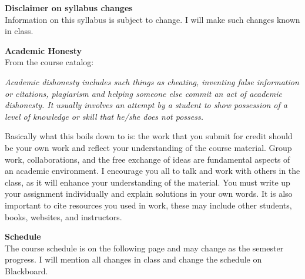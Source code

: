 \documentclass[11pt]{article}
\begin{document}
{\bf Disclaimer on syllabus changes} \\
Information on this syllabus is subject to change. I will make such changes known in class.

{\bf Academic Honesty} \\
From the course catalog:

{\small \it  Academic dishonesty includes such things as cheating, inventing false information or citations, plagiarism and helping someone else commit an act of academic dishonesty. It usually involves an attempt by a student to show possession of a level of knowledge or skill that he/she does not possess.}

Basically what this boils down to is: the work that you submit for credit should be your own work and reflect your understanding of the course material.  Group work, collaborations, and the free exchange of ideas are fundamental aspects of an academic environment.  I encourage you all to talk and work with others in the class, as it will enhance your understanding of the material.  You must write up your assignment individually and explain solutions in your own words. It is also important to cite resources you used in work, these may include other students, books, websites, and instructors.

{\bf Schedule} \\
The course schedule is on the following page and may change as the semester progress. I will mention all changes in class and change the schedule on Blackboard. \\


\clearpage
\end{document}
